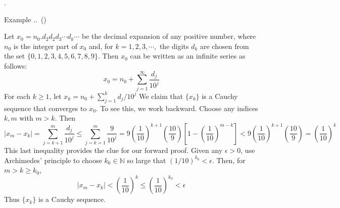 \documentclass[8pt]{beamer}
\newcounter{ex}
\renewcommand{\theex}{\thesection.\thesubsection.\arabic{ex}}
\renewenvironment{example}[1][]{%
    \refstepcounter{ex}%
    \begin{exampleblock}{Example \theex\if\relax\detokenize{#1}\relax\else\ (#1)\fi}%
}{%
    \end{exampleblock}%
}
\newcommand{\mbb}[1]{\mathbb{#1}}
\newcommand{\abs}[1]{\left\lvert #1 \right\rvert}
\begin{document}
\begin{frame}{.}
    

    \begin{example}
        Let $x_0 =n_0 . d_2 d_2 d_3 \cdots d_k \cdots$ be the decimal expansion of any positive number, where $n_0$ is the integer part of $x_0$ and, for $k=1,2,3,
        \cdots,$ the digits $d_k$ are chosen from the set $\{0,1,2,3,4,5,6,7,8,9\}$.
        Then $x_0$ can be written as an infinite series as follows:
        \[
            x_0 = n_0 + \sum_{j=1}^\infty \frac{d_j}{{10}^j}
        \]
        For each $k \ge 1$, let $x_k= n_0 + \sum^{k}_{j=1} d_j/{10}^j$
        We claim that $\{x_k\}$ is a Cauchy sequence that converges to $x_0$.
        To see this, we work backward.
        Choose any indices $k, m$ with $m > k$.
        Then
        \[
            \abs{x_m - x_k} = \sum_{j={k+1}}^{m} \frac{d_j}{{10}^j} \le \sum_{j={k=1}}^{m} \frac{9}{10^j} = 9 \left(\frac{1}{10}\right)^{k+1} \left(\frac{10}{9}\right) \left[1 - \left(\frac{1}{10}\right)^{m-k}\right] < 9 \left(\frac{1}{10}\right)^{k+1} \left(\frac{10}{9}\right) = \left(\frac{1}{10}\right)^k
        \]
        This last inequality provides the clue for our forward proof.
        Given any $\epsilon >0$, use Archimedes' principle to choose $k_0 \in \mbb{N}$ so large that $(1/10)^{k_0} < \epsilon$.
        Then, for $m > k \ge k_0$,
        \[
            \abs{x_m - x_k} < \left(\frac{1}{10}\right)^k \le \left(\frac{1}{10}\right)^{k_0} < \epsilon
        \]
        Thus $\{x_k\}$ is a Cauchy sequence.
    \end{example}
\end{frame}
\end{document}
